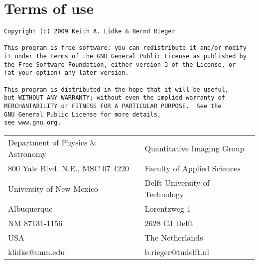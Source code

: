 \documentclass[11pt,letterpaper]{article}
\begin{document}
\section{Terms of use}
{\small
\begin{verbatim}
Copyright (c) 2009 Keith A. Lidke & Bernd Rieger

This program is free software: you can redistribute it and/or modify
it under the terms of the GNU General Public License as published by
the Free Software Foundation, either version 3 of the License, or
(at your option) any later version.

This program is distributed in the hope that it will be useful,
but WITHOUT ANY WARRANTY; without even the implied warranty of
MERCHANTABILITY or FITNESS FOR A PARTICULAR PURPOSE.  See the
GNU General Public License for more details,
see www.gnu.org.
\end{verbatim}
}

\begin{tabular}{ll}
Department of Physics \& Astronomy&Quantitative Imaging Group\\
800 Yale Blvd. N.E., MSC 07 4220 &Faculty of Applied Sciences\\
University of New Mexico         &Delft University of Technology\\
Albuquerque        &Lorentzweg 1\\
NM 87131-1156&2628 CJ Delft\\
USA&The Netherlands\\
klidke@unm.edu & b.rieger@tudelft.nl
\end{tabular}
\end{document}
